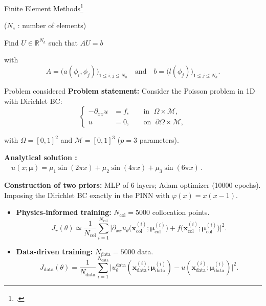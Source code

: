 \begin{subappendixframe}{Finite Element Methods\footcite{Ern2004TheoryAP}}
\begin{minipage}[t][][b]{0.2\linewidth}
		\tiny
		($N_e$ : number of elements)
	\end{minipage}
	
	\vspace{-5pt}
	Find $U\in\mathbb{R}^{N_h}$ such that \hspace{40pt} $AU=b$
	
	with 
	\begin{equation*}
		A=\big(a(\phi_i,\phi_j)\big)_{1\le i,j\le N_h} \quad \text{and} \quad b=\big(l(\phi_j)\big)_{1\le j\le N_h}.
	\end{equation*}
	\vspace{-3pt}
\end{subappendixframe}


\begin{appendixframe}{Problem considered}
	\textbf{Problem statement:} Consider the Poisson problem in 1D with Dirichlet BC:
	\vspace{-5pt}
	\begin{equation*}
		\left\{
		\begin{aligned}
			-\partial_{xx} u & = f, \; &  & \text{in } \; \Omega \times \mathcal{M}, \\
			u         & = 0, \;  &  & \text{on } \; \partial\Omega \times \mathcal{M},
		\end{aligned}
		\right.
	\end{equation*}

	\vspace{-5pt}
	with $\Omega=[0,1]^2$ and $\mathcal{M}=[0,1]^3$ ($p=3$ parameters).
		
	\vspace{4pt}
	\textbf{Analytical solution :} $\quad u(x;\bm{\mu})=\mu_1\sin(2\pi x)+\mu_2\sin(4\pi x)+\mu_3\sin(6\pi x) \,.$

	\vspace{4pt}
	\textbf{Construction of two priors:} MLP of 6 layers; Adam optimizer (10000 epochs). \\
	Imposing the Dirichlet BC exactly in the PINN with $\varphi(x)=x(x-1)$.

	\begin{itemize}
		\item \textbf{Physics-informed training:} $N_\text{col}=5000$ collocation points.
		$$J_r(\theta) \simeq
			\frac{1}{N_\text{col}} \sum_{i=1}^{N_\text{col}} \big| \partial_{xx}u_\theta(\bm{x}_\text{col}^{(i)};\bm{\mu}_\text{col}^{(i)}\big) + f\big(\bm{x}_\text{col}^{(i)};\bm{\mu}_\text{col}^{(i)}\big) \big|^2.$$
	
		\item \textbf{Data-driven training:}  $N_\text{data}=5000$ data.
		$$J_\text{data}(\theta) =
		\frac{1}{N_\text{data}}
		\sum_{i=1}^{N_\text{data}} \big| u_\theta^\text{data}(\bm{x}_\text{data}^{(i)};\bm{\mu}_\text{data}^{(i)}) - u(\bm{x}_\text{data}^{(i)};\bm{\mu}_\text{data}^{(i)}) \big|^2.$$
	\end{itemize}
\end{appendixframe}

